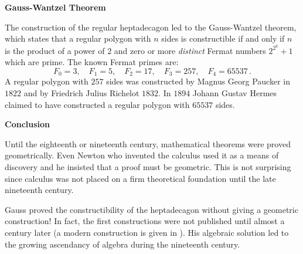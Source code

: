 \documentclass[a4paper,11pt]{article}
\begin{document}
\textbf{Gauss-Wantzel Theorem}

The construction of the regular heptadecagon led to the Gauss-Wantzel theorem, which states that a regular polygon with $n$ sides is constructible if and only if $n$ is the product of a power of $2$ and zero or more \emph{distinct} Fermat numbers $2^{2^k}+1$ which are prime. The known Fermat primes are:
\[
F_0=3,\quad F_1=5,\quad F_2=17,\quad F_3=257,\quad F_4=65537\,.
\]
A regular polygon with $257$ sides was constructed by Magnus Georg Paucker in $1822$ and by Friedrich Julius Richelot $1832$. In $1894$ Johann Gustav Hermes claimed to have constructed a regular polygon  with $65537$ sides.

\textbf{Conclusion}

Until the eighteenth or nineteenth century, mathematical theorems were proved geometrically. Even Newton who invented the calculus used it as a means of discovery and he insisted that a proof must be geometric. This is not surprising since calculus was not placed on a firm theoretical foundation until the late nineteenth century.

Gauss proved the constructibility of the heptadecagon without giving a geometric construction! In fact, the first constructions were not published until almost a century later (a modern construction is given in \cite{callagy}). His algebraic solution led to the growing ascendancy of algebra during the nineteenth century.


\nocite{*}


\end{document}
